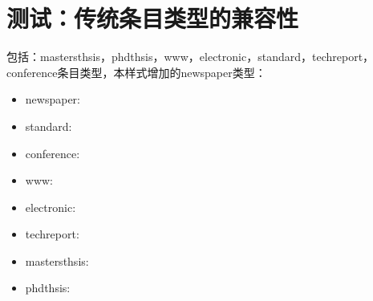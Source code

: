     \section{测试：传统条目类型的兼容性}
    \begin{refsection}

    包括：mastersthsis，phdthsis，www，electronic，standard，techreport，conference条目类型，本样式增加的newspaper类型：

    \begin{itemize}
      \item newspaper:\cite{张田勤2000--}
      \item standard:\cite{全国文献工作标准化委员会第七分委员会1986--,国家标准局信息分类编码研究所1988-59-92}
      \item conference:\cite{Li2004-21-24}
      \item www:\cite{萧钰2001--}
      \item electronic:\cite{OMG2003--}
      \item techreport:\cite{Humphrey1971--}
      \item mastersthsis:\cite{张志祥1998--}
      \item phdthsis:\cite{张若凌2004--}
    \end{itemize}

    \printbibliography[heading=subbibliography,title=【兼容phdthsis等条目类型】]
\end{refsection}





